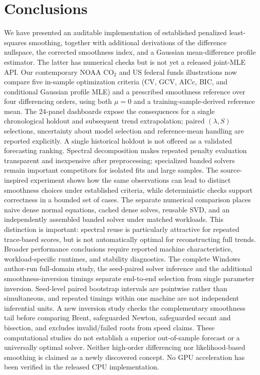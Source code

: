 \documentclass[pdflatex,sn-mathphys-ay]{sn-jnl}
\begin{document}




\section{Conclusions}
We have presented an auditable implementation of established penalized least-squares smoothing, together with additional derivations of the difference nullspace, the corrected smoothness index, and a Gaussian mean-difference profile estimator. The latter has numerical checks but is not yet a released joint-MLE API. Our contemporary NOAA CO$_2$ and US federal funds illustrations now compare five in-sample optimization criteria (CV, GCV, AICc, BIC, and conditional Gaussian profile MLE) and a prescribed smoothness reference over four differencing orders, using both $\mu=0$ and a training-sample-derived reference mean. The 24-panel dashboards expose the consequences for a single chronological holdout and subsequent trend extrapolation; paired $(\lambda,S)$ selections, uncertainty about model selection and reference-mean handling are reported explicitly. A single historical holdout is not offered as a validated forecasting ranking. Spectral decomposition makes repeated penalty evaluation transparent and inexpensive after preprocessing; specialized banded solvers remain important competitors for isolated fits and large samples. The source-inspired experiment shows how the same observations can lead to distinct smoothness choices under established criteria, while deterministic checks support correctness in a bounded set of cases. The separate numerical comparison places naive dense normal equations, cached dense solves, reusable SVD, and an independently assembled banded solver under matched workloads. This distinction is important: spectral reuse is particularly attractive for repeated trace-based scores, but is not automatically optimal for reconstructing full trends. Broader performance conclusions require reported machine characteristics, workload-specific runtimes, and stability diagnostics. The complete Windows author-run full-domain study, the seed-paired solver inference and the additional smoothness-inversion timings separate end-to-end selection from single parameter inversion. Seed-level paired bootstrap intervals are pointwise rather than simultaneous, and repeated timings within one machine are not independent inferential units. A new inversion study checks the complementary smoothness tail before comparing Brent, safeguarded Newton, safeguarded secant and bisection, and excludes invalid/failed roots from speed claims. These computational studies do not establish a superior out-of-sample forecast or a universally optimal solver. Neither high-order differencing nor likelihood-based smoothing is claimed as a newly discovered concept. No GPU acceleration has been verified in the released CPU implementation.
\end{document}
